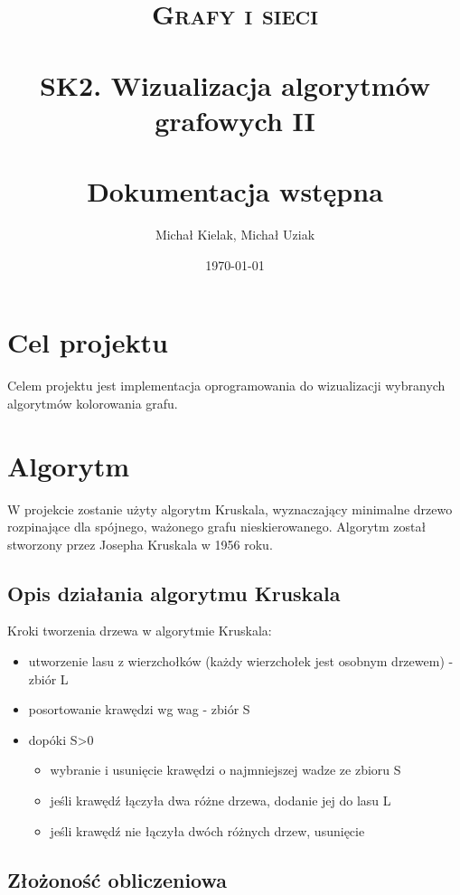 \documentclass[paper=a4, fontsize=11pt]{scrartcl} %
\title{	
\normalfont \normalsize 
\textsc{Grafy i sieci} \\ [25pt] %
\horrule{0.5pt} \\[0.4cm] %
\huge SK2. Wizualizacja algorytmów grafowych II \\ %
\horrule{2pt} \\[0.5cm] %
\LARGE Dokumentacja wstępna
}%
\author{Michał Kielak, Michał Uziak} %
\date{\normalsize\today} %
\numberwithin{equation}{section} %
\numberwithin{figure}{section} %
\numberwithin{table}{section} %
\begin{document}
\maketitle %


\section{Cel projektu}

Celem projektu jest implementacja oprogramowania do wizualizacji wybranych algorytmów kolorowania grafu.

\section{Algorytm}

W projekcie zostanie użyty algorytm Kruskala, wyznaczający minimalne drzewo rozpinające dla spójnego, ważonego grafu nieskierowanego. Algorytm został stworzony przez Josepha Kruskala w 1956 roku.
 

\subsection{Opis działania algorytmu Kruskala}

Kroki tworzenia drzewa w algorytmie Kruskala:
\begin{itemize}
	\item utworzenie lasu z wierzchołków (każdy wierzchołek jest osobnym drzewem) - zbiór L
	\item posortowanie krawędzi wg wag - zbiór S
	\item dopóki S>0
		\begin{itemize}
			\item wybranie i usunięcie krawędzi o najmniejszej wadze ze zbioru S
			\item jeśli krawędź łączyła dwa różne drzewa, dodanie jej do lasu L
			\item jeśli krawędź nie łączyła dwóch różnych drzew, usunięcie
		\end{itemize}
\end{itemize} 

\subsection{Złożoność obliczeniowa}
\end{document}

